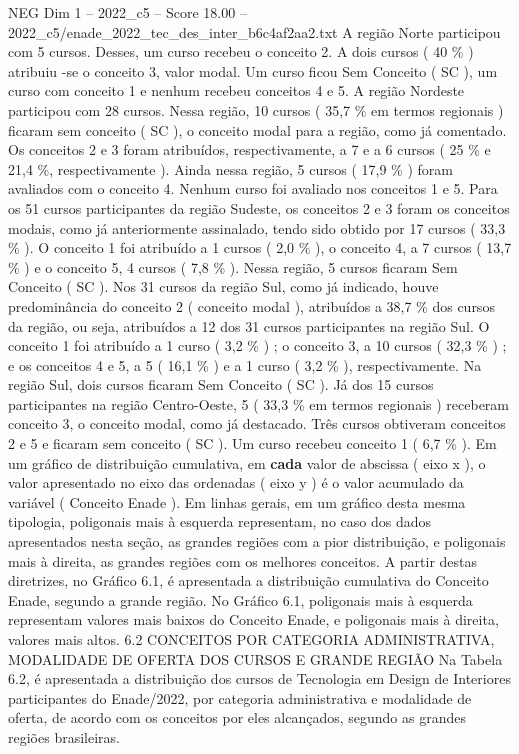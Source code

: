 \begin{textsample}{NEG Dim 1 – 2022\_c5 – Score 18.00 – 2022\_c5/enade\_2022\_tec\_des\_inter\_b6c4af2aa2.txt}
A região Norte participou com 5 cursos.
Desses, um curso recebeu o conceito 2.
A dois cursos ( 40 \% ) atribuiu -se o conceito 3, valor modal.
Um curso ficou Sem Conceito ( SC ), um curso com conceito 1 e nenhum recebeu conceitos 4 e 5.
A região Nordeste participou com 28 cursos.
Nessa região, 10 cursos ( 35,7 \% em termos regionais ) ficaram sem conceito ( SC ), o conceito modal para a região, como já comentado.
Os conceitos 2 e 3 foram atribuídos, respectivamente, a 7 e a 6 cursos ( 25 \% e 21,4 \%, respectivamente ).
Ainda nessa região, 5 cursos ( 17,9 \% ) foram avaliados com o conceito 4.
Nenhum curso foi avaliado nos conceitos 1 e 5.
Para os 51 cursos participantes da região Sudeste, os conceitos 2 e 3 foram os conceitos modais, como já anteriormente assinalado, tendo sido obtido por 17 cursos ( 33,3 \% ).
O conceito 1 foi atribuído a 1 cursos ( 2,0 \% ), o conceito 4, a 7 cursos ( 13,7 \% ) e o conceito 5, 4 cursos ( 7,8 \% ).
Nessa região, 5 cursos ficaram Sem Conceito ( SC ).
Nos 31 cursos da região Sul, como já indicado, houve predominância do conceito 2 ( conceito modal ), atribuídos a 38,7 \% dos cursos da região, ou seja, atribuídos a 12 dos 31 cursos participantes na região Sul.
O conceito 1 foi atribuído a 1 curso ( 3,2 \% ) ; o conceito 3, a 10 cursos ( 32,3 \% ) ; e os conceitos 4 e 5, a 5 ( 16,1 \% ) e a 1 curso ( 3,2 \% ), respectivamente.
Na região Sul, dois cursos ficaram Sem Conceito ( SC ).
Já dos 15 cursos participantes na região Centro-Oeste, 5 ( 33,3 \% em termos regionais ) receberam conceito 3, o conceito modal, como já destacado.
Três cursos obtiveram conceitos 2 e 5 e ficaram sem conceito ( SC ).
Um curso recebeu conceito 1 ( 6,7 \% ).
Em um gráfico de distribuição cumulativa, em \textbf{cada} valor de abscissa ( eixo x ), o valor apresentado no eixo das ordenadas ( eixo y ) é o valor acumulado da variável ( Conceito Enade ).
Em linhas gerais, em um gráfico desta mesma tipologia, poligonais mais à esquerda representam, no caso dos dados apresentados nesta seção, as grandes regiões com a pior distribuição, e poligonais mais à direita, as grandes regiões com os melhores conceitos.
A partir destas diretrizes, no Gráfico 6.1, é apresentada a distribuição cumulativa do Conceito Enade, segundo a grande região.
No Gráfico 6.1, poligonais mais à esquerda representam valores mais baixos do Conceito Enade, e poligonais mais à direita, valores mais altos. 6.2 CONCEITOS POR CATEGORIA ADMINISTRATIVA, MODALIDADE DE OFERTA DOS CURSOS E GRANDE REGIÃO Na Tabela 6.2, é apresentada a distribuição dos cursos de Tecnologia em Design de Interiores participantes do Enade/2022, por categoria administrativa e modalidade de oferta, de acordo com os conceitos por eles alcançados, segundo as grandes regiões brasileiras.

\end{textsample}
